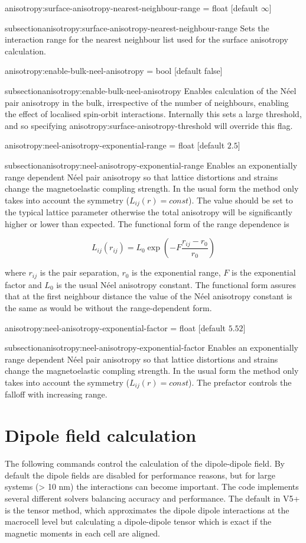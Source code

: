 {\zicf anisotropy:surface-anisotropy-nearest-neighbour-range = float [default $\infty$]}
{subsection}{anisotropy:surface-anisotropy-nearest-neighbour-range} Sets the
interaction range for the nearest neighbour list used for the surface anisotropy
calculation.

{\zicf anisotropy:enable-bulk-neel-anisotropy = bool [default false]}
{subsection}{anisotropy:enable-bulk-neel-anisotropy} Enables calculation of the
N\'eel pair anisotropy in the bulk, irrespective of the number of neighbours,
enabling the effect of localised spin-orbit interactions. Internally this sets a
large threshold, and so specifying anisotropy:surface-anisotropy-threshold will
override this flag.

{\zicf anisotropy:neel-anisotropy-exponential-range = float [default $2.5$]}
{subsection}{anisotropy:neel-anisotropy-exponential-range} Enables an
exponentially range dependent N\'eel pair anisotropy so that lattice distortions
and strains change the magnetoelastic compling strength. In the usual form the
method only takes into account the symmetry ($L_{ij}(r) = const$). The value
should be set to the typical lattice parameter otherwise the total anisotropy
will be significantly higher or lower than expected. The functional form of the
range dependence is

\begin{equation}
   L_{ij}(r_{ij}) = L_0 \exp\left(-F\frac{r_{ij} - r_0}{r_{0}}\right)
\end{equation}

\noindent where $r_{ij}$ is the pair separation, $r_0$ is the exponential range,
$F$ is the exponential factor and $L_0$ is the usual N\'eel anisotropy constant.
The functional form assures that at the first neighbour distance the value of
the N\'eel anisotropy constant is the same as would be without the
range-dependent form.

{\zicf anisotropy:neel-anisotropy-exponential-factor = float [default $5.52$]}
{subsection}{anisotropy:neel-anisotropy-exponential-factor} Enables an
exponentially range dependent N\'eel pair anisotropy so that lattice distortions
and strains change the magnetoelastic compling strength. In the usual form the
method only takes into account the symmetry ($L_{ij}(r) = const$). The prefactor
controls the falloff with increasing range.

\section*{Dipole field calculation}
The following commands control the calculation of the dipole-dipole field. By
default the dipole fields are disabled for performance reasons, but for large
systems (> 10 nm) the interactions can become important. The \vampire code
implements several different solvers balancing accuracy and performance. The
default in V5+ is the tensor method, which approximates the dipole dipole
interactions at the macrocell level but calculating a dipole-dipole tensor which
is exact if the magnetic moments in each cell are aligned.

